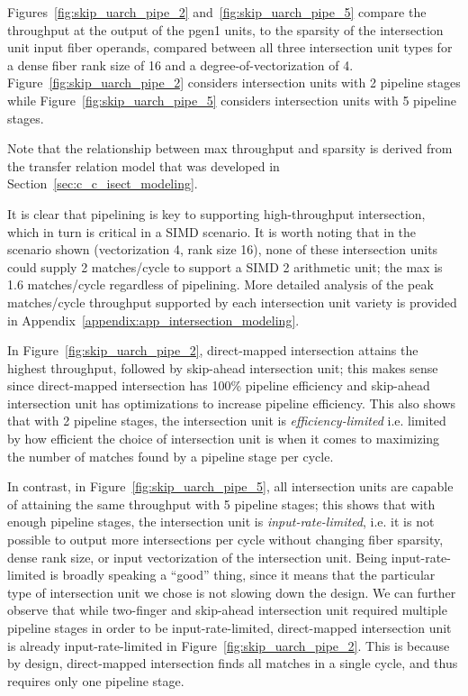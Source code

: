 Figures~\ref{fig:skip_uarch_pipe_2} and~\ref{fig:skip_uarch_pipe_5} compare the throughput at the output of the pgen1 units, to the sparsity of the intersection unit input fiber operands, compared between all three intersection unit types for a dense fiber rank size of 16 and a degree-of-vectorization of 4. Figure~\ref{fig:skip_uarch_pipe_2} considers intersection units with 2 pipeline stages while Figure~\ref{fig:skip_uarch_pipe_5} considers intersection units with 5 pipeline stages. 

Note that the relationship between max throughput and sparsity is derived from the transfer relation model that was developed in Section~\ref{sec:c_c_isect_modeling}.

It is clear that pipelining is key to supporting high-throughput intersection, which in turn is critical in a SIMD scenario. It is worth noting that in the scenario shown (vectorization 4, rank size 16), none of these intersection units could supply 2 matches/cycle to support a SIMD 2 arithmetic unit; the max is 1.6 matches/cycle regardless of pipelining. More detailed analysis of the peak matches/cycle throughput supported by each intersection unit variety is provided in Appendix~\ref{appendix:app_intersection_modeling}.

In Figure~\ref{fig:skip_uarch_pipe_2}, direct-mapped intersection attains the highest throughput, followed by skip-ahead intersection unit; this makes sense since direct-mapped intersection has 100\% pipeline efficiency and skip-ahead intersection unit has optimizations to increase pipeline efficiency. This also shows that with 2 pipeline stages, the intersection unit is \textit{efficiency-limited} i.e. limited by how efficient the choice of intersection unit is when it comes to maximizing the number of matches found by a pipeline stage per cycle.

In contrast, in Figure~\ref{fig:skip_uarch_pipe_5}, all intersection units are capable of attaining the same throughput with 5 pipeline stages; this shows that with enough pipeline stages, the intersection unit is \textit{input-rate-limited}, i.e. it is not possible to output more intersections per cycle without changing fiber sparsity, dense rank size, or input vectorization of the intersection unit. Being input-rate-limited is broadly speaking a ``good'' thing, since it means that the particular type of intersection unit we chose is not slowing down the design. We can further observe that while two-finger and skip-ahead intersection unit required multiple pipeline stages in order to be input-rate-limited, direct-mapped intersection unit is already input-rate-limited in Figure~\ref{fig:skip_uarch_pipe_2}. This is because by design, direct-mapped intersection finds all matches in a single cycle, and thus requires only one pipeline stage.

